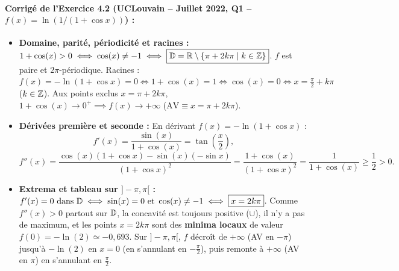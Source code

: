 \paragraph{Corrigé de l'Exercice 4.2 (UCLouvain -- Juillet 2022, Q1 -- $f(x) = \ln(1/(1+\cos x))$) :}
\begin{itemize}
    \item \textbf{Domaine, parité, périodicité et racines :} $1 + \cos(x) > 0 \iff \cos(x) \neq -1 \iff \boxed{\mathbb{D} = \mathbb{R} \setminus \{\pi + 2k\pi \mid k \in \mathbb{Z}\}}$. $f$ est paire et $2\pi$-périodique. Racines : $f(x) = -\ln(1+\cos x) = 0 \iff 1 + \cos(x) = 1 \iff \cos(x) = 0 \iff \boxed{x = \frac{\pi}{2} + k\pi}$ ($k \in \mathbb{Z}$). Aux points exclus $x = \pi + 2k\pi$, $1 + \cos(x) \to 0^+ \implies f(x) \to +\infty$ ($\text{AV} \equiv x = \pi + 2k\pi$).
    \item \textbf{Dérivées première et seconde :} En dérivant $f(x) = -\ln(1+\cos x)$ :
    \[
        \boxed{f'(x) = \frac{\sin(x)}{1 + \cos(x)} = \tan\left(\frac{x}{2}\right)},
    \]
    \[
        \boxed{f''(x) = \frac{\cos(x)(1+\cos x) - \sin(x)(-\sin x)}{(1+\cos x)^2} = \frac{1 + \cos(x)}{(1+\cos x)^2} = \frac{1}{1 + \cos(x)} \ge \frac{1}{2} > 0}.
    \]
    \item \textbf{Extrema et tableau sur $]-\pi, \pi[$ :} $f'(x) = 0 \text{ dans } \mathbb{D} \iff \sin(x) = 0 \text{ et } \cos(x) \neq -1 \iff \boxed{x = 2k\pi}$. Comme $f''(x) > 0$ partout sur $\mathbb{D}$, la concavité est toujours positive ($\cup$), il n'y a pas de maximum, et les points $x = 2k\pi$ sont des \textbf{minima locaux} de valeur $f(0) = -\ln(2) \simeq -0,693$. Sur $]-\pi, \pi[$, $f$ décroît de $+\infty$ (AV en $-\pi$) jusqu'à $-\ln(2)$ en $x=0$ (en s'annulant en $-\frac{\pi}{2}$), puis remonte à $+\infty$ (AV en $\pi$) en s'annulant en $\frac{\pi}{2}$.
\end{itemize}

